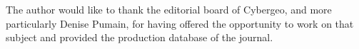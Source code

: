 
\begin{acknowledgements}
The author would like to thank the editorial board of Cybergeo, and more particularly Denise Pumain, for having offered the opportunity to work on that subject and provided the production database of the journal. 
\end{acknowledgements}






















%
%














